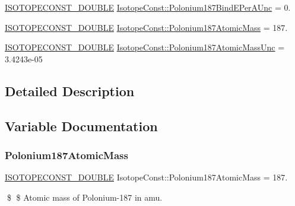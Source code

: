 \begin{DoxyCompactItemize}
\mbox{\hyperlink{group___isotope_const-_macros_ga8f45a7272ce02c0b4c65c44636ed719a}{I\+S\+O\+T\+O\+P\+E\+C\+O\+N\+S\+T\+\_\+\+D\+O\+U\+B\+LE}} \mbox{\hyperlink{group___isotope_const-_polonium-_po187_ga00dece971317ce00cd13f1708b275ace}{Isotope\+Const\+::\+Polonium187\+Bind\+E\+Per\+A\+Unc}} = 0.
\item 
\mbox{\hyperlink{group___isotope_const-_macros_ga8f45a7272ce02c0b4c65c44636ed719a}{I\+S\+O\+T\+O\+P\+E\+C\+O\+N\+S\+T\+\_\+\+D\+O\+U\+B\+LE}} \mbox{\hyperlink{group___isotope_const-_polonium-_po187_ga21aa73bc09668bcc08e1d7c9f6a662dd}{Isotope\+Const\+::\+Polonium187\+Atomic\+Mass}} = 187.
\item 
\mbox{\hyperlink{group___isotope_const-_macros_ga8f45a7272ce02c0b4c65c44636ed719a}{I\+S\+O\+T\+O\+P\+E\+C\+O\+N\+S\+T\+\_\+\+D\+O\+U\+B\+LE}} \mbox{\hyperlink{group___isotope_const-_polonium-_po187_gaddfb6ca44d6d88d27aa21d7a2539ebf4}{Isotope\+Const\+::\+Polonium187\+Atomic\+Mass\+Unc}} = 3.\+4243e-\/05
\end{DoxyCompactItemize}


\subsection{Detailed Description}


\subsection{Variable Documentation}
\mbox{\label{group___isotope_const-_polonium-_po187_ga21aa73bc09668bcc08e1d7c9f6a662dd}} 
\subsubsection{\texorpdfstring{Polonium187\+Atomic\+Mass}{Polonium187AtomicMass}}
{\footnotesize\ttfamily \mbox{\hyperlink{group___isotope_const-_macros_ga8f45a7272ce02c0b4c65c44636ed719a}{I\+S\+O\+T\+O\+P\+E\+C\+O\+N\+S\+T\+\_\+\+D\+O\+U\+B\+LE}} Isotope\+Const\+::\+Polonium187\+Atomic\+Mass = 187.}

\$ \$ Atomic mass of Polonium-\/187 in amu. \mbox{\label{group___isotope_const-_polonium-_po187_gaddfb6ca44d6d88d27aa21d7a2539ebf4}} 
